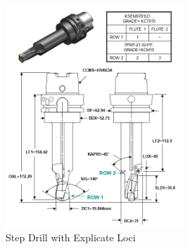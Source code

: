 \documentclass{mtconnect}	%
\begin{document}
\begin{figure}[ht]
  \centering
  \includegraphics[width=0.6\textwidth]{figures/a11-step-drill-with-explicate-loci.png}
  \caption{Step Drill with Explicate Loci}
  \label{fig:a11-step-drill-with-explicate-loci}
\end{figure}
\FloatBarrier
\end{document}

